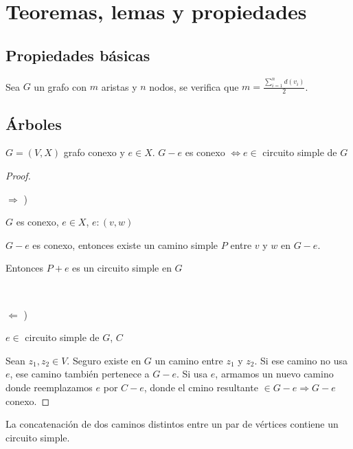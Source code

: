 \section{Teoremas, lemas y propiedades}

\subsection{Propiedades básicas}

\begin{lema}
\label{aristasGrados}
    Sea $G$ un grafo con $m$ aristas y $n$ nodos, se verifica que $m = \frac{\sum_{i = 1}^{n}d(v_i)}{2}$.
\end{lema}

\subsection{Árboles}

\begin{lema}
\label{eCircSimple}
    $G = (V, X)$ grafo conexo y $e \in X$. $G - e$ es conexo $\Longleftrightarrow e \in$ circuito simple de $G$    

\end{lema}

\begin{proof}
    ~

    $\Longrightarrow$ )

    $G$ es conexo, $e \in X$, $e:(v, w)$

    $G - e$ es conexo, entonces existe un camino simple $P$ entre $v$ y $w$ en $G - e$.

    Entonces $P + e$ es un circuito simple en $G$

    ~

    $\Longleftarrow$ )

    $e \in$ circuito simple de $G$, $C$

    Sean $z_1, z_2 \in V$. Seguro existe en $G$ un camino entre $z_1$ y $z_2$. Si ese camino no usa $e$, ese camino también pertenece a $G - e$. Si usa $e$, armamos un nuevo camino donde reemplazamos $e$ por $C - e$, donde el cmino resultante $\in G - e \Longrightarrow G - e$ conexo.
\end{proof}

\begin{lema}
\label{concatCircSimple}
    La concatenación de dos caminos distintos entre un par de vértices contiene un circuito simple.
\end{lema}

